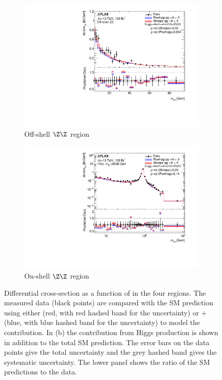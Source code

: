 \begin{figure}[H]
\begin{subfigure}{.49\textwidth}
      \includegraphics[width=.95\linewidth]{Figures/m4l/UnfoldedResults/linY_Unfolded_Data_m34_m4loffshell.pdf}  \caption{Off-shell $\Z\Z$ region}\label{fig:sub-third}
    \end{subfigure}
    \begin{subfigure}{.49\textwidth}\centering
      \includegraphics[width=.95\linewidth]{Figures/m4l/UnfoldedResults/Unfolded_Data_m34_m4l180-2000.pdf}  \caption{On-shell $\Z\Z$ region}\label{fig:sub-fourth}
    \end{subfigure}
    \caption{Differential cross-section as a function of \mZTwo{} in the four
        \mFourL{} regions. The measured data (black points) are  compared with the SM prediction using either \SHERPA{} (red, with red hashed band for the uncertainty) or \POWHEG{} + \pythia{} (blue, with blue hashed band for the uncertainty) to model the \qqFourL{} contribution. In (b) the contribution from Higgs production is shown in addition to the total SM prediction. The error bars on the data points give the total uncertainty and the grey hashed band gives the systematic uncertainty. \Pvalue{} The  lower panel shows the ratio of the SM predictions to the data.}
    \label{fig:m34_m4l}
\end{figure}

